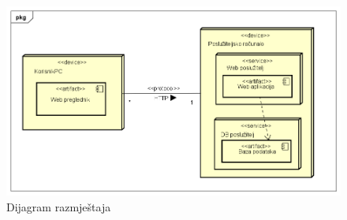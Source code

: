 			\begin{figure}[H]
			\includegraphics[scale=0.2]{slike/DijagramRazmjestaja.png}
			\centering
			\caption{Dijagram razmještaja}
			\label{fig:promjene}
				\end{figure}
			
			
			
			
		
			
			
			
			
			
		
			
			
			
		
		
